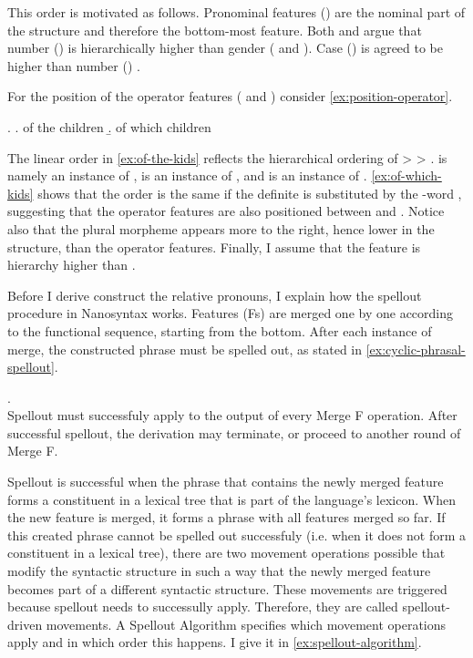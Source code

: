 This order is motivated as follows. Pronominal features () are the nominal part of the structure and therefore the bottom-most feature.
Both \citet{picallo2008} and \citet{kramer2016} argue that number () is hierarchically higher than gender ( and ). Case () is agreed to be higher than number () \citep[cf.][]{bittner1996}.

For the position of the operator features ( and ) consider \ref{ex:position-operator}.

\ex.\label{ex:position-operator}
\a.\label{ex:of-the-kids} of the children
\b.\label{ex:of-which-kids} of which children

The linear order in \ref{ex:of-the-kids} reflects the hierarchical ordering of  >  > .  is namely an instance of ,  is an instance of , and  is an instance of .
\ref{ex:of-which-kids} shows that the order is the same if the definite is substituted by the -word , suggesting that the operator features are also positioned between  and .
Notice also that the plural morpheme  appears more to the right, hence lower in the structure, than the operator features.
Finally, I assume that the feature  is hierarchy higher than .

Before I derive construct the relative pronouns, I explain how the spellout procedure in Nanosyntax works. Features (Fs) are merged one by one according to the functional sequence, starting from the bottom. After each instance of merge, the constructed phrase must be spelled out, as stated in \ref{ex:cyclic-phrasal-spellout}.

\ex.  \citep{caha2020a}\\
Spellout must successfuly apply to the output of every Merge F operation. After successful spellout, the derivation may terminate, or proceed to another round of Merge F.\label{ex:cyclic-phrasal-spellout}

Spellout is successful when the phrase that contains the newly merged feature forms a constituent in a lexical tree that is part of the language's lexicon.
When the new feature is merged, it forms a phrase with all features merged so far.
If this created phrase cannot be spelled out successfuly (i.e. when it does not form a constituent in a lexical tree), there are two movement operations possible that modify the syntactic structure in such a way that the newly merged feature becomes part of a different syntactic structure.
These movements are triggered because spellout needs to successully apply. Therefore, they are called spellout-driven movements.
A Spellout Algorithm specifies which movement operations apply and in which order this happens. I give it in \ref{ex:spellout-algorithm}.

